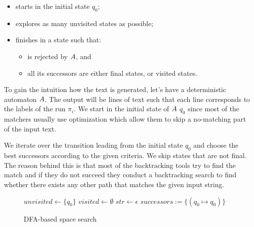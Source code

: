 \documentclass[acmsmall,screen]{acmart}
\begin{document}
\begin{itemize}
 \item starts in the initial state $q_0$;
\item explores as many unvisited states as possible;
\item finishes in a state such that:
   \begin{itemize}
     \item is rejected by $A$, and
	\item all its successors are either final states, or visited states.
      \end{itemize}
 \end{itemize}

To gain the intuition how the text is generated, let's have a deterministic automaton $A$. 
%
The output will be lines of text such that each line corresponds to the labels of the run $\pi_i$.
%
We start in the initial state of $A$ $q_0$ since most of the matchers usually use optimization which allow them to skip a no-matching part of the input text.
%

We iterate over the transition leading from the initial state $q_0$ and choose the best successors according to the given criteria. 
%
We skip states that are not final. 
%
The reason behind this is that most of the backtracking tools try to find the match and if they do not succeed 
%
they conduct a backtracking search to find whether there exists any other path that matches the given input string.
%

 \begin{figure}[t]
\begin{center}
\begin{algorithm}[H]
\caption{DFA-based space search}
\label{algo:basic}
    $unvisited \leftarrow \{q_0\}$\;
    $visited \leftarrow \emptyset$\;
    $str \leftarrow \epsilon$\;
    $successors:=\{ (q_0\mapsto q_0)\}$\;
    
      \label{ln:ret}
\end{algorithm}		
\end{center}
\vspace*{-7mm}
\end{figure}
\end{document}
